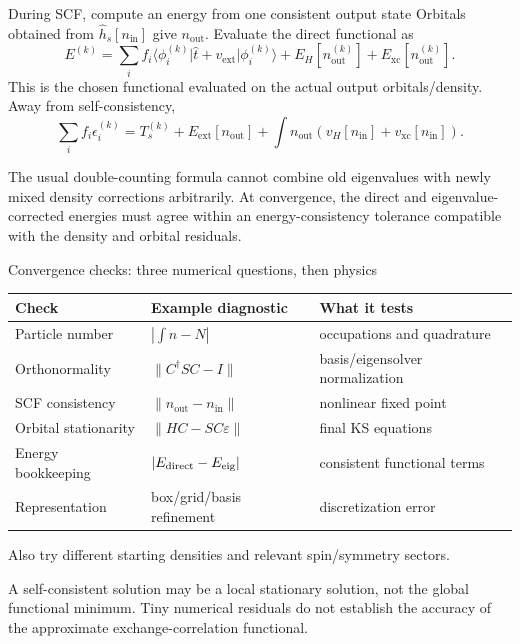 \documentclass[aspectratio=169,10pt]{beamer}
\newcommand{\warnbox}[1]{\begin{tcolorbox}[colback=palewarm,colframe=warm,title={A trap to avoid}]#1\end{tcolorbox}}
\newcommand{\dftbox}[1]{\begin{tcolorbox}[colback=paleteal,colframe=teal,title={Key result}]#1\end{tcolorbox}}
\newcommand{\ket}[1]{\lvert #1\rangle}
\newcommand{\bra}[1]{\langle #1\rvert}
\newcommand{\ext}{\mathrm{ext}}
\newcommand{\xc}{\mathrm{xc}}
\newcommand{\inp}{\mathrm{in}}
\newcommand{\out}{\mathrm{out}}
\begin{document}
\begin{frame}{During SCF, compute an energy from one consistent output state}
Orbitals obtained from $\hat h_s[n_{\inp}]$ give $n_{\out}$.
Evaluate the direct functional as
\[
 E^{(k)}=\sum_i f_i\bra{\phi_i^{(k)}}\hat t+v_{\ext}\ket{\phi_i^{(k)}}
                   +E_H[n_{\out}^{(k)}]+E_{\xc}[n_{\out}^{(k)}].
\]
This is the chosen functional evaluated on the actual output orbitals/density.
Away from self-consistency,
\[
 \sum_i f_i\epsilon_i^{(k)}=T_s^{(k)}+E_{\ext}[n_{\out}]
                  +\int n_{\out}(v_H[n_{\inp}]+v_{\xc}[n_{\inp}]).
\]
\warnbox{The usual double-counting formula cannot combine old eigenvalues
with newly mixed density corrections arbitrarily. At convergence, the
direct and eigenvalue-corrected energies must agree within an energy-consistency
tolerance compatible with the density and orbital residuals.}
\end{frame}

\begin{frame}{Convergence checks: three numerical questions, then physics}
\begin{center}\small
\begin{tabular}{@{}lll@{}}
\toprule
Check & Example diagnostic & What it tests\\\midrule
Particle number & $|\int n-N|$ & occupations and quadrature\\
Orthonormality & $\|C^\dagger S C-I\|$ & basis/eigensolver normalization\\
SCF consistency & $\|n_{\out}-n_{\inp}\|$ & nonlinear fixed point\\
Orbital stationarity & $\|HC-SC\varepsilon\|$ & final KS equations\\
Energy bookkeeping & $|E_{\rm direct}-E_{\rm eig}|$ & consistent functional terms\\
Representation & box/grid/basis refinement & discretization error\\\bottomrule
\end{tabular}
\end{center}
Also try different starting densities and relevant spin/symmetry sectors.
\dftbox{A self-consistent solution may be a local stationary solution, not
the global functional minimum. Tiny numerical residuals do not establish
the accuracy of the approximate exchange-correlation functional.}
\end{frame}
\end{document}
